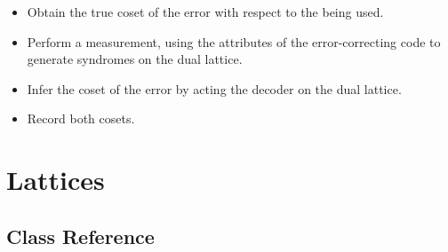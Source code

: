 \documentclass[letterpaper,10pt,english]{sphinxmanual}
\begin{document}
\begin{fulllineitems}
\begin{fulllineitems}
\begin{itemize}
\item {} 
Obtain the true coset of the error with respect to the {\hyperref[code:py_qcode.ErrorCorrectingCode]{}} being used.

\item {} 
Perform a measurement, using the attributes of the error-correcting code to generate syndromes on the dual lattice.

\item {} 
Infer the coset of the error by acting the decoder on the dual lattice.

\item {} 
Record both cosets.

\end{itemize}

\end{fulllineitems}


\begin{fulllineitems}
\label{simulation:py_qcode.Simulation.save}
\end{fulllineitems}


\end{fulllineitems}



\chapter{Lattices}
\label{lattice:lattices}\label{lattice::doc}

\section{Class Reference}
\label{lattice:class-reference}
\end{document}
